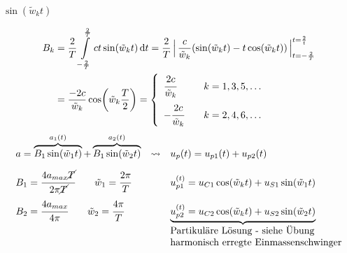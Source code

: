 \documentclass[12pt]{exam}
\begin{document}
\begin{questions}
\begin{solution}
\begin{minipage}[t]{.49\linewidth}
    $\sin(\tilde{w}_k t)$\\
    
    \end{minipage}
 \vspace{1em}
 
    \begin{align*}
     B_k &= \frac{2}{T} \int\limits_{-\frac{2}{T}}^{\frac{2}{T}} ct \sin(\tilde{w}_k t) \dd{t} = \frac{2}{T}\,\Big|\, \frac{c}{\tilde{w}_k}(\sin(\tilde{w}_k t)-t\cos(\tilde{w}_k t))\,\Big|_{t={-\frac{2}{T}}}^{t=\frac{2}{t}} \\
     &= \frac{-2c}{\tilde{w}_k} \cos(\tilde{w}_k\frac{T}{2}) = 
     \left\{
     \begin{array}{lll}
     \cfrac{2c}{\tilde{w}_k} & &k = 1,3,5,\dots\\[1em]
     -\cfrac{2c}{\tilde{w}_k} & &k = 2,4,6,\dots 
     \end{array}\right.
\end{align*}
\begin{align*}
     \begin{array}{lcl}
        a = \overbrace{B_1\sin(\tilde{w}_1 t)}^{a_1(t)} + \overbrace{B_1\sin(\tilde{w}_2 t)}^{a_2(t)} & \rightsquigarrow & u_p(t) = u_{p1}(t) + u_{p2}(t) \\[1em]
        B_1 = \cfrac{4a_{max}\cancel{T}}{2\pi\cancel{T}} \qquad \tilde{w}_1 = \cfrac{2\pi}{T} && u_{p1}^{(t)} = u_{C1} \cos(\tilde{w}_k t) + u_{S1} \sin(\tilde{w}_1 t) \\[1em]
        B_2 = \cfrac{4a_{max}}{4\pi} \qquad \tilde{w}_2 = \cfrac{4\pi}{T}&& \underbrace{u_{p2}^{(t)} = u_{C2} \cos(\tilde{w}_k t) + u_{S2} \sin(\tilde{w}_2 t)} \\
        &&\text{Partikuläre Lösung - siehe Übung}\\
        &&\text{harmonisch erregte Einmassenschwinger}
        \end{array}
\end{align*}\\[2em]
 

\end{solution}
\end{questions}
\end{document}
